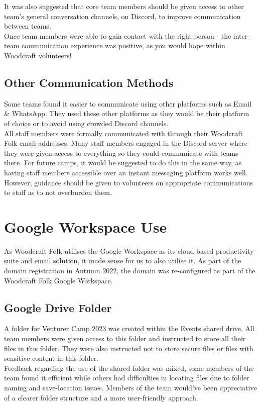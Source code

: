 It was also suggested that core team members should be given access to other team's general conversation channels, on Discord, to improve communication between teams.\\

Once team members were able to gain contact with the right person - the inter-team communication experience was positive, as you would hope within Woodcraft volunteers! 

\subsection{Other Communication Methods}
Some teams found it easier to communicate using other platforms such as Email \& WhatsApp. They used these other platforms as they would be their platform of choice or to avoid using crowded Discord channels. \\

All staff members were formally communicated with through their Woodcraft Folk email addresses. Many staff members engaged in the Discord server where they were given access to everything so they could communicate with teams there. For future camps, it would be suggested to do this in the same way, as having staff members accessible over an instant messaging platform works well. However, guidance should be given to volunteers on appropriate communications to staff as to not overburden them.


\section{Google Workspace Use}
As Woodcraft Folk utilises the Google Workspace as its cloud based productivity suite and email solution, it made sense for us to also utilise it. As part of the domain registration in Autumn 2022, the domain was re-configured as part of the Woodcraft Folk Google Workspace. 
\subsection{Google Drive Folder}
A folder for Venturer Camp 2023 was created within the Events shared drive. All team members were given access to this folder and instructed to store all their files in this folder. They were also instructed not to store secure files or files with sensitive content in this folder.\\

Feedback regarding the use of the shared folder was mixed, some members of the team found it efficient while others had difficulties in locating files due to folder naming and save-location issues. Members of the team would've been appreciative of a clearer folder structure and a more user-friendly approach.\\


